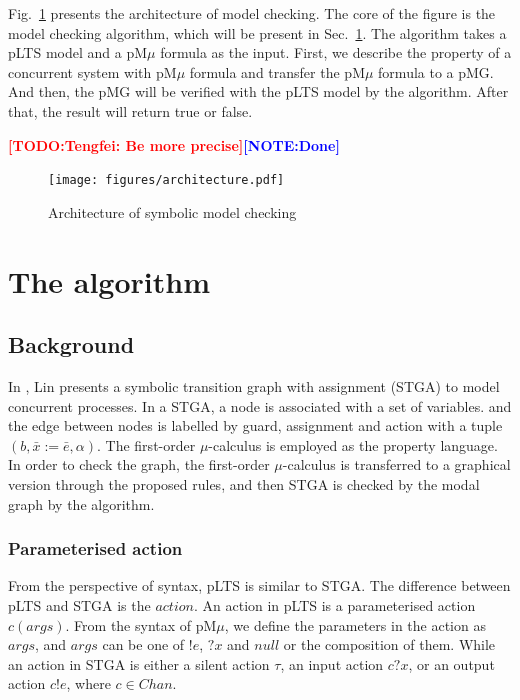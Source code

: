 \documentclass[runningheads,a4paper]{llncs}
\newcommand{\TODO}[1]{\textcolor{red}{\textbf{[TODO:#1]}}}
\newcommand{\NOTE}[1]{\textcolor{blue}{\textbf{[NOTE:#1]}}}
\begin{document}
Fig.~\ref{architectrue} presents the architecture of model checking. The core of the figure is the model checking algorithm, which will be present in Sec.~\ref{algorithm}. The algorithm takes a pLTS model and a pM$\mu$ formula as the input. First, we describe the property of a concurrent system with pM$\mu$ formula and transfer the pM$\mu$ formula to a pMG. And then, the pMG will be verified with the pLTS model by the algorithm. After that, the result will return true or false.

\TODO{Tengfei: Be more precise}\NOTE{Done}


\begin{figure}
    \centering\texttt{[image: figures/architecture.pdf]}
    \caption{Architecture of symbolic model checking}
    \label{architectrue}
\end{figure}




\section{The algorithm}\label{algorithm}

\subsection{Background}

 In \cite{lin1996stga}, Lin presents a symbolic transition graph with assignment (STGA) to model concurrent processes. In a STGA, a node is associated with a set of variables. and the edge between nodes is labelled by guard, assignment and action with a tuple $(b, \bar{x}:=\bar{e}, \alpha)$. The first-order $\mu$-calculus is employed as the property language. In order to check the graph, the first-order $\mu$-calculus is transferred to a graphical version through the proposed rules, and then STGA is checked by the modal graph by the algorithm.
 

 
 \subsubsection{Parameterised action}
From the perspective of syntax, pLTS is similar to STGA. The difference between pLTS and STGA is the $\mathit{action}$. An action in pLTS is a parameterised action $c(args)$. From the syntax of pM$\mu$, we define the parameters in the action as $args$, and $args$ can be one of $!e$, $?x$ and $null$ or the composition of them. While an action in STGA is either a silent action $\tau$, an input action $c?x$, or an output action $c!e$, where $c\in Chan$. 
\end{document}
